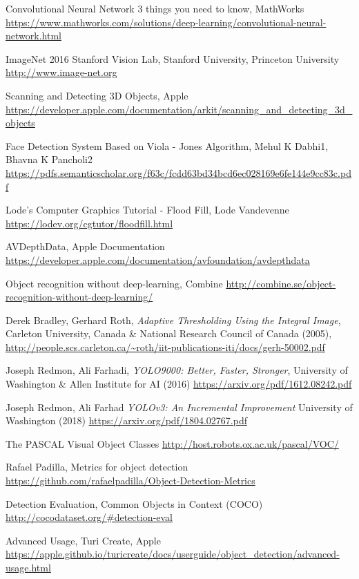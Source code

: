 \begin{thebibliography}{X}
Convolutional Neural Network 3 things you need to know, MathWorks
\url{https://www.mathworks.com/solutions/deep-learning/convolutional-neural-network.html}


ImageNet
 2016 Stanford Vision Lab, Stanford University, Princeton University 
\url{http://www.image-net.org}

Scanning and Detecting 3D Objects, Apple
\url{https://developer.apple.com/documentation/arkit/scanning_and_detecting_3d_objects}

Face Detection System Based on Viola - Jones Algorithm, Mehul K Dabhi1, Bhavna K Pancholi2
\url{https://pdfs.semanticscholar.org/f63c/fcdd63bd34bcd6ec028169e6fe144e9cc83c.pdf}

Lode's Computer Graphics Tutorial - Flood Fill, Lode Vandevenne
\url{https://lodev.org/cgtutor/floodfill.html}


AVDepthData, Apple Documentation
\url{https://developer.apple.com/documentation/avfoundation/avdepthdata}

Object recognition without deep-learning, Combine
\url{http://combine.se/object-recognition-without-deep-learning/}

Derek Bradley, Gerhard Roth, \textit{Adaptive Thresholding Using the Integral Image},
Carleton University, Canada \& National Research Council of Canada (2005), 
\url{http://people.scs.carleton.ca/~roth/iit-publications-iti/docs/gerh-50002.pdf}



Joseph Redmon, Ali Farhadi, \textit{YOLO9000:
Better, Faster, Stronger}, 
University of Washington \& Allen Institute for AI (2016)
\url{https://arxiv.org/pdf/1612.08242.pdf}

Joseph Redmon, Ali Farhad
\textit{YOLOv3: An Incremental Improvement}
University of Washington (2018)
\url{https://arxiv.org/pdf/1804.02767.pdf}

The PASCAL Visual Object Classes
\url{http://host.robots.ox.ac.uk/pascal/VOC/}


Rafael Padilla, Metrics for object detection
\url{https://github.com/rafaelpadilla/Object-Detection-Metrics}

Detection Evaluation, Common Objects in Context (COCO)
\url{http://cocodataset.org/#detection-eval}

Advanced Usage, Turi Create, Apple
\url{https://apple.github.io/turicreate/docs/userguide/object_detection/advanced-usage.html}


\end{thebibliography}
